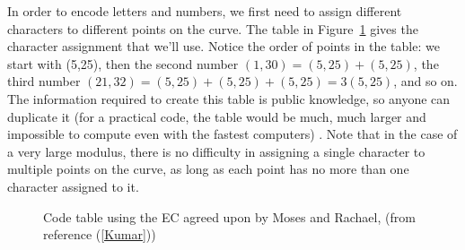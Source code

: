 In order to encode letters and numbers, we first need to assign different characters to different points on the curve. The table in Figure~\ref{fig:DH:DHKE_17} gives the character assignment that we'll use. Notice the order of points in the table: we start with (5,25), then the second number $(1,30) =(5,25)+(5,25)$, the third number $(21,32)=(5,25)+(5,25)+(5,25)=3(5,25)$, and so on. The information required to create this table is public knowledge, so anyone can duplicate it (for a practical code, the table would be much, much larger and impossible to compute even with the fastest computers) . Note that in the case of a very large modulus, there is no difficulty in assigning a single character to multiple points on the curve, as long as each point has no more than one character assigned to it.

\begin{figure}[htbp]
	  \caption{\label{fig:DH:DHKE_17} Code table using the EC agreed upon by Moses and Rachael, (from reference (\ref{Kumar}))}
\end{figure}


